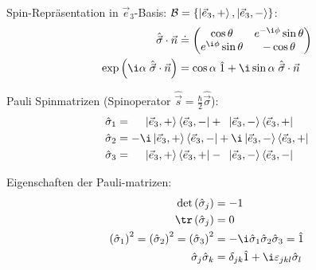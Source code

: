 \documentclass[11pt]{article}
\numberwithin{equation}{section}
\begin{document}
			\noindent
			Spin-Repräsentation in $\vec{e}_3$-Basis: $\mathcal{B} = \{ \Ket{\vec{e}_3,+}, \Ket{\vec{e}_3,-} \}$:
			\begin{equation}
				\begin{aligned}
					\hat{\vec{\sigma}} \cdot \vec{n} &\doteq
					\left( \begin{matrix}
						\cos\theta & e^{-\i\phi}\sin\theta \\
						e^{\i\phi}\sin\theta & -\cos\theta \\
					\end{matrix} \right) \\
					\exp\left( \i\alpha \; \hat{\vec{\sigma}} \cdot \vec{n} \right) &= \cos\alpha \;\hat{1} + \i\sin\alpha \; \hat{\vec{\sigma}} \cdot \vec{n} \\
				\end{aligned}
			\end{equation}

			\noindent
			Pauli Spinmatrizen (Spinoperator $\hat{\vec{s}} = \frac{\hbar}{2} \hat{\vec{\sigma}}$):
			\begin{equation}
				\begin{aligned}
					\hat{\sigma}_1 &= \phantom{-i}\Ket{\vec{e}_3,+} \Bra{\vec{e}_3,-} + \phantom{i}\Ket{\vec{e}_3,-} \Bra{\vec{e}_3,+} \\
					\hat{\sigma}_2 &= -\i\Ket{\vec{e}_3,+} \Bra{\vec{e}_3,-} + \i\Ket{\vec{e}_3,-} \Bra{\vec{e}_3,+} \\
					\hat{\sigma}_3 &= \phantom{-i}\Ket{\vec{e}_3,+} \Bra{\vec{e}_3,+} - \phantom{i}\Ket{\vec{e}_3,-} \Bra{\vec{e}_3,-} \\
				\end{aligned}
			\end{equation}

			\noindent
			Eigenschaften der Pauli-matrizen:
			\begin{equation}
				\begin{aligned}
					\det\Br{\hat{\sigma}_j} &= -1 \\
					\tr\Br{\hat{\sigma}_j} &= 0 \\
					\Br{\hat{\sigma}_1}^2 = \Br{\hat{\sigma}_2}^2 = \Br{\hat{\sigma}_3}^2 &= -\i\hat{\sigma}_1\hat{\sigma}_2\hat{\sigma}_3 = \hat{1} \\
					\hat{\sigma}_j \hat{\sigma}_k &= \delta_{jk}\hat{1} + \i\varepsilon_{jkl}\hat{\sigma}_l
				\end{aligned}
			\end{equation}
\end{document}
